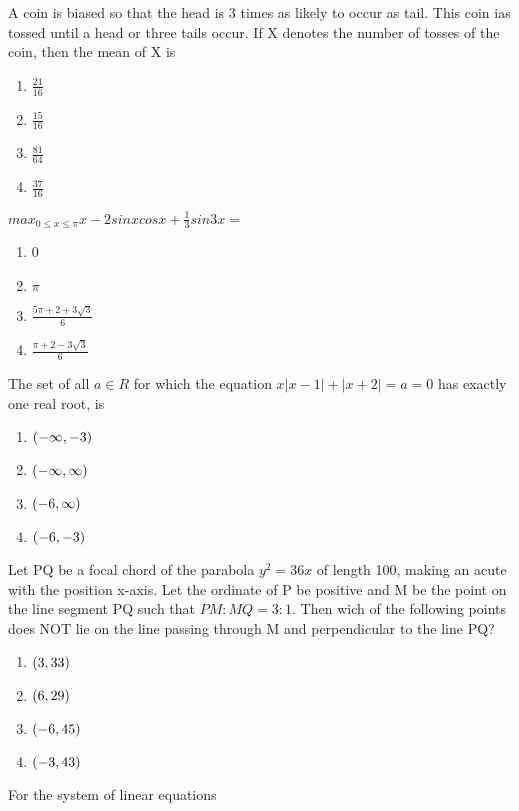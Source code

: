 \item A coin is biased so that the head is 3 times as likely to occur as tail. This coin ias tossed until a head or three tails occur. If X denotes the number of tosses of the coin, then the mean of X is 
\hfill{}
\begin{enumerate}
    \item $\frac{21}{16}$
    \item $\frac{15}{16}$
    \item $\frac{81}{64}$
    \item $\frac{37}{16}$
\end{enumerate}
\item $max_{0 \leq x\leq \pi}{x-2sinxcosx+ \frac{1}{3}sin3x}=$
\hfill{}
\begin{enumerate}
    \item 0
    \item $\pi$
    \item $\frac{5\pi+2+3\sqrt{3}}{6}$
    \item $\frac{\pi+2-3\sqrt{3}}{6}$
\end{enumerate}
\item The set of all $a \in R$ for which the equation $x|x-1| + |x+2| = a =0$ has exactly one real root, is
\hfill{}
\begin{enumerate}
    \item $\left(-\infty,-3\right)$
    \item $\left(-\infty,\infty\right)$
    \item $\left(-6,\infty\right)$
    \item $\left(-6,-3\right)$
\end{enumerate}
\item Let PQ be a focal chord of the parabola $y^2 = 36x$ of length 100, making an acute with the position x-axis. Let the ordinate of P be positive and M be the point on the line segment PQ such that $PM:MQ=3:1$. Then wich of the following points does NOT lie on the line passing through M and perpendicular to the line PQ? 
\hfill{}
\begin{enumerate}
    \item $\left(3,33\right)$
    \item $\left(6,29\right)$
    \item $\left(-6,45\right)$
    \item $\left(-3,43\right)$
\end{enumerate}
\item For the system of linear equations\\

